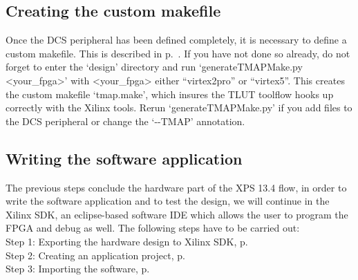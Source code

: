 \documentclass[a4paper,oneside]{memoir}
\begin{document}
\subsection{Creating the custom makefile}\label{sec:creating_makefile_blaze}

Once the DCS peripheral has been defined completely, it is necessary to define a custom makefile. This is described in p.\ \pageref{sec:creating_makefile}. If you have not done so already, do not forget to enter the `design' directory and run `generateTMAPMake.py <your\_fpga>' with <your\_fpga> either ``virtex2pro'' or ``virtex5''. This creates the custom makefile `tmap.make', which insures the TLUT toolflow hooks up correctly with the Xilinx tools. Rerun `generateTMAPMake.py' if you add files to the DCS peripheral or change the `-\--TMAP' annotation.

\subsection{Writing the software application}\label{sec:writing_software_blaze}

The previous steps conclude the hardware part of the XPS 13.4 flow, in order to write the software application and to test the design, we will continue in the Xilinx SDK, an eclipse-based software IDE which allows the user to program the FPGA and debug as well. The following steps have to be carried out:
\\   
Step 1: Exporting the hardware design to Xilinx SDK, p.\ \pageref{sec:expot_sdk_blaze}\\
Step 2: Creating an application project, p.\ \pageref{sec:creating_application_blaze}\\
Step 3: Importing the software, p.\ \pageref{sec:import_software_blaze}\\
\end{document}
